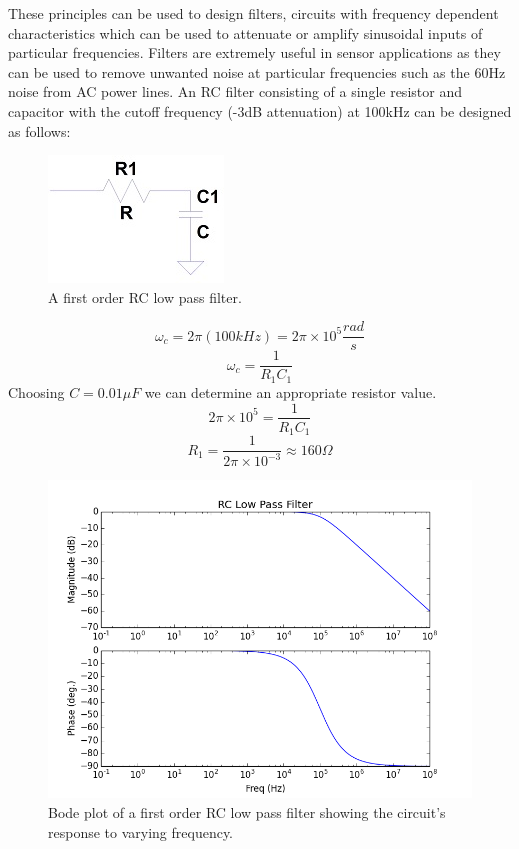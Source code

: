 \documentclass[11pt]{article}
\begin{document}
    These principles can be used to design filters, circuits with frequency dependent characteristics which can be used to attenuate or amplify sinusoidal inputs of particular frequencies.  Filters are extremely useful in sensor applications as they can be used to remove unwanted noise at particular frequencies such as the 60Hz noise from AC power lines.
    An RC filter consisting of a single resistor and capacitor with the cutoff frequency (-3dB attenuation) at 100kHz can be designed as follows:
    \begin{figure}[h!]
    \centering
    \includegraphics[scale=1.7]{lowpass.jpg}
    \caption{A first order RC low pass filter.}
    \label{fig:lowpass}
    \end{figure}
    
    $$\omega_c = 2\pi (100 kHz) = 2\pi \times 10^5  \frac{rad}{s}$$
    $$\omega_c = \frac{1}{R_1C_1}$$
    Choosing $C = 0.01\mu F$ we can determine an appropriate resistor value. 
    $$2\pi \times 10^5 = \frac{1}{R_1C_1}$$
    $$R_1 = \frac{1}{2\pi \times 10^{-3}}\approx 160\Omega$$
    
    \begin{figure}[h!]
    \centering
    \includegraphics[scale=0.5]{rc_low_pass.png}
    \caption{Bode plot of a first order RC low pass filter showing the circuit's response to varying frequency.}
    \label{fig:lowpass_bode}
    \end{figure}
    
\end{document}
